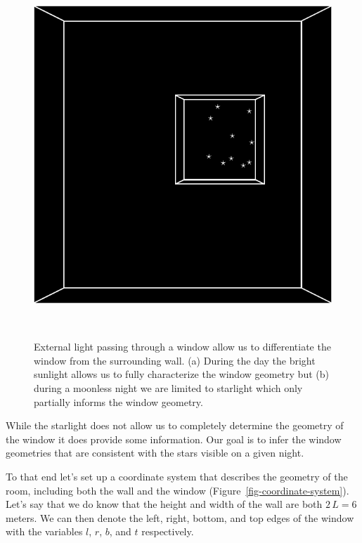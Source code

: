 \documentclass[
  letterpaper,
  DIV=11,
  numbers=noendperiod]{scrartcl}
\begin{document}
\begin{figure}
\begin{minipage}{0.44\linewidth}
{\captionsetup{labelsep=none}\includegraphics{figures/nighttime/nighttime.pdf}

}

\subcaption{\label{fig-nighttime}}

\end{minipage}%
%
\begin{minipage}{0.04\linewidth}
~\end{minipage}%

\caption{\label{fig-setup}External light passing through a window allow
us to differentiate the window from the surrounding wall. (a) During the
day the bright sunlight allows us to fully characterize the window
geometry but (b) during a moonless night we are limited to starlight
which only partially informs the window geometry.}

\end{figure}%

While the starlight does not allow us to completely determine the
geometry of the window it does provide some information. Our goal is to
infer the window geometries that are consistent with the stars visible
on a given night.

To that end let's set up a coordinate system that describes the geometry
of the room, including both the wall and the window
(Figure~\ref{fig-coordinate-system}). Let's say that we do know that the
height and width of the wall are both \(2 \, L = 6\) meters. We can then
denote the left, right, bottom, and top edges of the window with the
variables \(l\), \(r\), \(b\), and \(t\) respectively.
\end{document}
